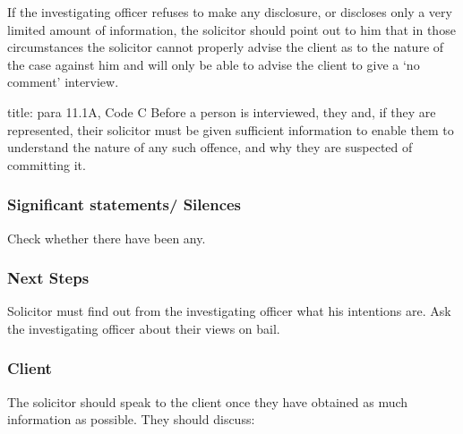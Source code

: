\documentclass[
]{article}
\newenvironment{Shaded}{}{}
\newcommand{\NormalTok}[1]{#1}
\begin{document}
If the investigating officer refuses to make any disclosure, or
discloses only a very limited amount of information, the solicitor
should point out to him that in those circumstances the solicitor cannot
properly advise the client as to the nature of the case against him and
will only be able to advise the client to give a `no comment' interview.

\begin{Shaded}
\begin{Highlighting}[]
\NormalTok{title: para 11.1A, Code C}
\NormalTok{Before a person is interviewed, they and, if they are represented, their solicitor must be given sufficient information to enable them to understand the nature of any such offence, and why they are suspected of committing it.}
\end{Highlighting}
\end{Shaded}

\hypertarget{significant-statements-silences}{%
\subsubsection{Significant statements/
Silences}\label{significant-statements-silences}}

Check whether there have been any.

\hypertarget{next-steps}{%
\subsubsection{Next Steps}\label{next-steps}}

Solicitor must find out from the investigating officer what his
intentions are. Ask the investigating officer about their views on bail.

\hypertarget{client}{%
\subsubsection{Client}\label{client}}

The solicitor should speak to the client once they have obtained as much
information as possible. They should discuss:
\end{document}
